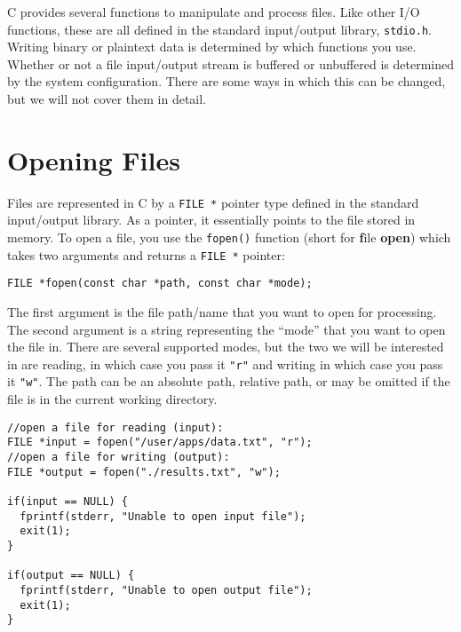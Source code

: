 

C provides several functions to manipulate and
process files.  Like other I/O functions, these
are all defined in the standard input/output
library, \texttt{stdio.h}.  Writing
binary or plaintext data is determined by which
functions you use. Whether or not a file input/output
stream is buffered or unbuffered is determined by
the system configuration.  There are some ways
in which this can be changed, but we will not 
cover them in detail.

\section{Opening Files}

Files are represented in C by a \texttt{FILE *}
pointer type defined in the standard input/output
library.  As a pointer, it essentially points to the
file stored in memory. To open a file, you use the \texttt{fopen()} 
function (short for \textbf{f}ile \textbf{open}) which
takes two arguments and returns a \texttt{FILE *}
pointer:

\texttt{FILE *fopen(const char *path, const char *mode);}

The first argument is the file path/name that you want
to open for processing.  The second argument is a
string representing the ``mode'' that you want to open the
file in.  There are several supported modes, but the two 
we will be interested in are reading, in which case you
pass it \texttt{"r"} and writing in which case you
pass it \texttt{"w"}.  The path can be an absolute 
path, relative path, or may be omitted if the file is in the
current working directory.

\begin{verbatim}
//open a file for reading (input):
FILE *input = fopen("/user/apps/data.txt", "r");
//open a file for writing (output):
FILE *output = fopen("./results.txt", "w");

if(input == NULL) {
  fprintf(stderr, "Unable to open input file");
  exit(1);
}

if(output == NULL) {
  fprintf(stderr, "Unable to open output file");
  exit(1);
}
\end{verbatim}

